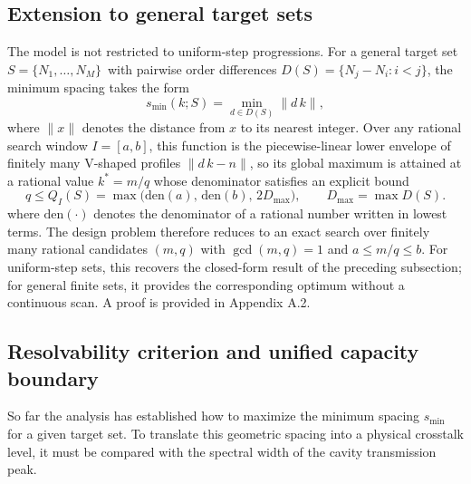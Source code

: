 \documentclass{optica-article}
\begin{document}
\subsection{Extension to general target sets}

The model is not restricted to uniform-step progressions. For a general target set $S=\{N_1,\dots,\allowbreak N_M\}$\allowbreak\ with pairwise order differences $D(S)=\{N_j-N_i:\allowbreak i<j\}$, the minimum spacing takes the form
\begin{equation}
s_{\min}(k;S) = \min_{d\in D(S)} \|d\,k\|,
\label{eq:oe_smin_general}
\end{equation}
where $\|x\|$ denotes the distance from $x$ to its nearest integer. Over any rational search window $I=[a,b]$, this function is the piecewise-linear lower envelope of finitely many V-shaped profiles $\|d\,k-n\|$, so its global maximum is attained at a rational value $k^*=m/q$ whose denominator satisfies an explicit bound
\begin{equation}
q \le Q_I(S) = \max\!\bigl(\mathrm{den}(a),\,\mathrm{den}(b),\,2D_{\max}\bigr),\qquad D_{\max}=\max D(S).
\label{eq:oe_Q_bound}
\end{equation}
where $\mathrm{den}(\cdot)$ denotes the denominator of a rational number written in lowest terms.
The design problem therefore reduces to an exact search over finitely many rational candidates $(m,q)$ with $\gcd(m,q)=1$ and $a\le m/q\le b$. For uniform-step sets, this recovers the closed-form result of the preceding subsection; for general finite sets, it provides the corresponding optimum without a continuous scan. A proof is provided in Appendix A.2.

\subsection{Resolvability criterion and unified capacity boundary}

So far the analysis has established how to maximize the minimum spacing $s_{\min}$ for a given target set. To translate this geometric spacing into a physical crosstalk level, it must be compared with the spectral width of the cavity transmission peak.
\end{document}

